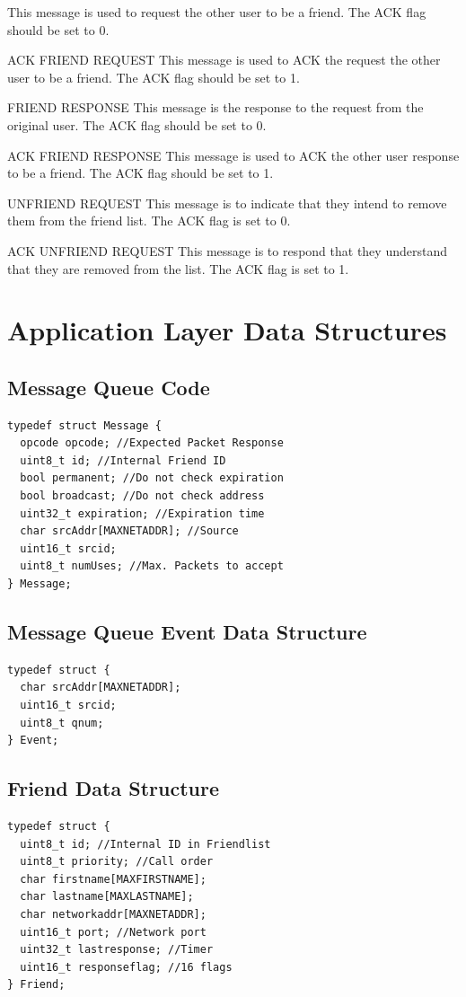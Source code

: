 \documentclass[journal,compsoc]{IEEEtran}
\begin{document}
\begin{LaTeXdescription}
  This message is used to request the other user to be a friend.
  The ACK flag should be set to 0.
  \item[ACK FRIEND REQUEST]
  This message is used to ACK the request the other user to be a friend.
  The ACK flag should be set to 1.
  \item[FRIEND RESPONSE]
  This message is the response to the request from the original user.
  The ACK flag should be set to 0.
  \item[ACK FRIEND RESPONSE]
  This message is used to ACK the other user response to be a friend.
  The ACK flag should be set to 1.
  \item[UNFRIEND REQUEST]
  This message is to indicate that they intend to remove them from the friend list.
  The ACK flag is set to 0.
  \item[ACK UNFRIEND REQUEST]
  This message is to respond that they understand that they are removed from the list.
  The ACK flag is set to 1.
\end{LaTeXdescription}

\section{Application Layer Data Structures}
\subsection{Message Queue Code}
\label{Message Queue Code}
\begin{lstlisting}
typedef struct Message {
  opcode opcode; //Expected Packet Response
  uint8_t id; //Internal Friend ID
  bool permanent; //Do not check expiration
  bool broadcast; //Do not check address
  uint32_t expiration; //Expiration time
  char srcAddr[MAXNETADDR]; //Source
  uint16_t srcid;
  uint8_t numUses; //Max. Packets to accept
} Message;
\end{lstlisting}

\subsection{Message Queue Event Data Structure}
\label{Message Queue Event Data Structure}
\begin{lstlisting}
typedef struct {
  char srcAddr[MAXNETADDR];
  uint16_t srcid;
  uint8_t qnum;
} Event;
\end{lstlisting}

\subsection{Friend Data Structure}
\label{Friend Data Structure}
\begin{lstlisting}
typedef struct {
  uint8_t id; //Internal ID in Friendlist
  uint8_t priority; //Call order
  char firstname[MAXFIRSTNAME];
  char lastname[MAXLASTNAME];
  char networkaddr[MAXNETADDR];
  uint16_t port; //Network port
  uint32_t lastresponse; //Timer
  uint16_t responseflag; //16 flags
} Friend;
\end{lstlisting}
\end{document}
